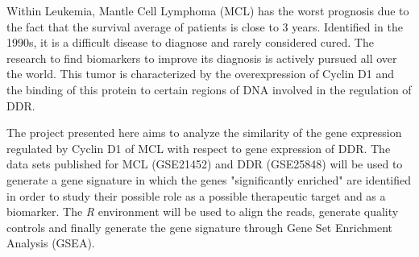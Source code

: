 Within Leukemia, Mantle Cell Lymphoma (MCL) has the worst prognosis due to the fact that the survival average of patients is close to 3 years. Identified in the 1990s, it is a difficult disease to diagnose and rarely considered cured. The research to find biomarkers to improve its diagnosis is actively pursued all over the world. This tumor is characterized by the overexpression of Cyclin D1 and the binding of this protein to certain regions of DNA involved in the regulation of DDR.

The project presented here aims to analyze the similarity of the gene expression regulated by Cyclin D1 of MCL with respect to gene expression of DDR. The data sets published for MCL (GSE21452) and DDR (GSE25848) will be used to generate a gene signature in which the genes "significantly enriched" are identified in order to study their possible role as a possible therapeutic target and as a biomarker. The \textit{R} environment will be used to align the reads, generate quality controls and finally generate the gene signature through Gene Set Enrichment Analysis (GSEA).
